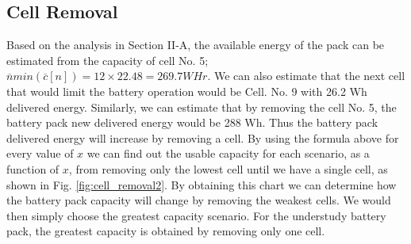 \documentclass[10pt,twocolumn]{IEEEtran}
\begin{document}
%

\subsection{Cell Removal}
Based on the analysis in Section II-A, the available energy of the pack can be estimated from the capacity of cell No.  5; 
$\overline{n} min(\overline{c}[n]) = 12 \times 22.48 = 269. 7 WHr$.
We can also estimate that the next cell that would limit the battery operation would be Cell. No. 9 with 26.2 Wh delivered energy.
Similarly, we can estimate that by removing the cell No. 5, the battery pack new delivered energy would be 288 Wh.
Thus the battery pack delivered energy will increase by removing a cell.
By using the formula above for every value of $x$ we can find out the usable capacity for each scenario, as a function of $x$, from removing only the lowest cell until we have a single cell, as shown in Fig. \ref{fig:cell_removal2}. 
By obtaining this  chart  we can determine how the battery pack capacity will change by removing the weakest cells. 
We would then simply choose the greatest capacity scenario.
For the understudy battery pack, the greatest capacity is obtained by removing only one cell.

\end{document}
